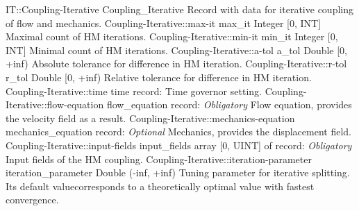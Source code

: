 \begin{RecordType}
	{IT::Coupling-Iterative}
	{Coupling{\_}Iterative}
	{}%
	{}%
	{{{Record with data for iterative coupling of flow and mechanics.}%
}}
		\RecKey
			{Coupling-Iterative::max-it}
			{max{\_}it}
			{{Integer [0, INT]}}{}
			{ }
			{{{Maximal count of HM iterations.}%
}}
		\RecKey
			{Coupling-Iterative::min-it}
			{min{\_}it}
			{{Integer [0, INT]}}{}
			{ }
			{{{Minimal count of HM iterations.}%
}}
		\RecKey
			{Coupling-Iterative::a-tol}
			{a{\_}tol}
			{{Double [0, +inf)}}{}
			{ }
			{{{Absolute tolerance for difference in HM iteration.}%
}}
		\RecKey
			{Coupling-Iterative::r-tol}
			{r{\_}tol}
			{{Double [0, +inf)}}{}
			{ }
			{{{Relative tolerance for difference in HM iteration.}%
}}
		\RecKey
			{Coupling-Iterative::time}
			{time}
			{{record: }}{}
			{ \ValueDefault{{\{}{\}}}}
			{{{Time governor setting.}%
}}
		\RecKey
			{Coupling-Iterative::flow-equation}
			{flow{\_}equation}
			{{record: }}{}
			{ \it{Obligatory}}
			{{{Flow equation, provides the velocity field as a result.}%
}}
		\RecKey
			{Coupling-Iterative::mechanics-equation}
			{mechanics{\_}equation}
			{{record: }}{}
			{ \it{Optional}}
			{{{Mechanics, provides the displacement field.}%
}}
		\RecKey
			{Coupling-Iterative::input-fields}
			{input{\_}fields}
			{{array [0, UINT] of }{record: }}{}
			{ \it{Obligatory}}
			{{{Input fields of the HM coupling.}%
}}
		\RecKey
			{Coupling-Iterative::iteration-parameter}
			{iteration{\_}parameter}
			{{Double (-inf, +inf)}}{}
			{ }
			{{{Tuning parameter for iterative splitting.
Its default valuecorresponds to a theoretically optimal value with fastest convergence.}%
}}
\end{RecordType}
